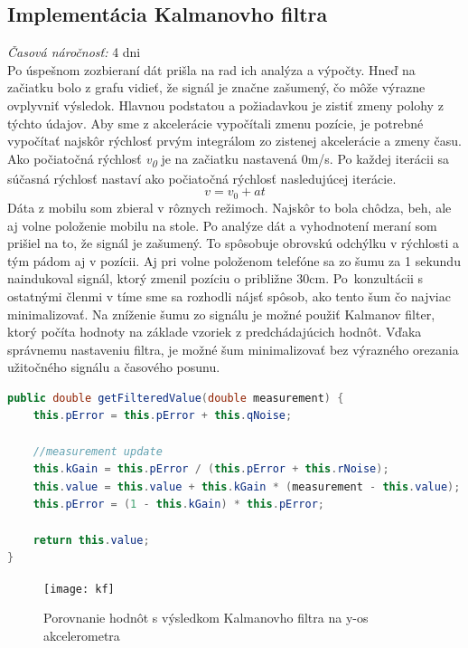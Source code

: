 \documentclass[11pt, oneside]{report}
\begin{document}
\subsection{Implementácia Kalmanovho filtra}
\textit{Časová náročnosť:} 4 dni\\
Po úspešnom zozbieraní dát prišla na rad ich analýza a výpočty. Hneď na začiatku bolo z grafu vidieť, že signál je značne zašumený, čo môže  výrazne ovplyvniť  výsledok. Hlavnou podstatou a požiadavkou je zistiť zmeny polohy z týchto údajov. Aby sme z akcelerácie vypočítali  zmenu pozície, je potrebné vypočítať najskôr rýchlosť prvým integrálom zo zistenej akcelerácie a zmeny času. Ako počiatočná rýchlosť \textit{v\textsubscript{0}} je na začiatku nastavená 0m/s. Po každej iterácii sa  súčasná  rýchlosť nastaví ako  počiatočná rýchlosť nasledujúcej iterácie.
\begin{equation}
v=  v_0+at 
\end{equation}
Dáta z mobilu som zbieral v rôznych režimoch. Najskôr to bola chôdza, beh, ale aj volne položenie mobilu na stole. Po analýze dát a  vyhodnotení meraní som prišiel na to, že signál je zašumený. To spôsobuje obrovskú odchýlku v rýchlosti a tým pádom aj v pozícii. Aj pri volne položenom telefóne sa zo šumu za 1 sekundu naindukoval signál, ktorý zmenil pozíciu o približne 30cm. Po~konzultácii s  ostatnými členmi v tíme sme sa rozhodli nájsť  spôsob, ako tento šum čo najviac minimalizovať. 
Na zníženie šumu zo signálu je možné použiť Kalmanov filter\cite{bishop2001introduction}, ktorý počíta hodnoty  na základe vzoriek z predchádajúcich hodnôt. Vďaka správnemu nastaveniu   filtra, je možné  šum minimalizovať bez výrazného orezania užitočného signálu a časového posunu.
\lstset{language=Java}
\begin{lstlisting}[language=Java,showstringspaces=false, caption= Metóda na spracovanie hodnoty pomocou Kalmanovho filtra,captionpos=b]
public double getFilteredValue(double measurement) {
    this.pError = this.pError + this.qNoise;

    //measurement update
    this.kGain = this.pError / (this.pError + this.rNoise);
    this.value = this.value + this.kGain * (measurement - this.value);
    this.pError = (1 - this.kGain) * this.pError;
	
    return this.value;
}
\end{lstlisting}



\begin{figure}[h]
    \centering
    \texttt{[image: kf]}
    \caption{Porovnanie hodnôt s výsledkom Kalmanovho filtra na y-os akcelerometra}
    \label{fig:kalman}
\end{figure}
\newpage	
\end{document}
